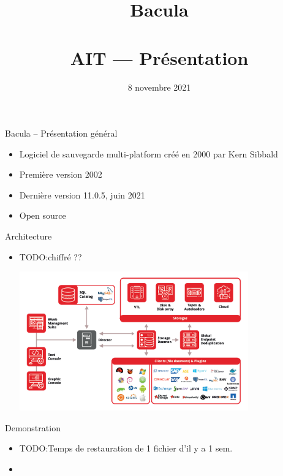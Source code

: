 \documentclass[aspectratio=169]{beamer}
\title{Bacula\\~\\AIT --- Présentation}
\date{8 novembre 2021}
\newcommand{\TODO}{TODO:}
\begin{document}
\begin{frame}
  \titlepage
\end{frame}

\begin{frame}{Bacula -- Présentation général}
 \begin{itemize}
  \item Logiciel de sauvegarde multi-platform créé en 2000 par Kern Sibbald
  \item Première version 2002
  \item Dernière version 11.0.5, juin 2021
  \item Open source
 \end{itemize}
\end{frame}

\begin{frame}{Architecture}
 \begin{itemize}
  \item \TODO chiffré ??
  \begin{center}
  \includegraphics[height=60mm]{architecture.png}
   
  \end{center}

  
 \end{itemize}
\end{frame}

\begin{frame}{Demonstration}
 \begin{itemize}
  \item \TODO Temps de restauration de 1 fichier d'il y a 1 sem.
  \item 
 \end{itemize}
\end{frame}
\end{document}
